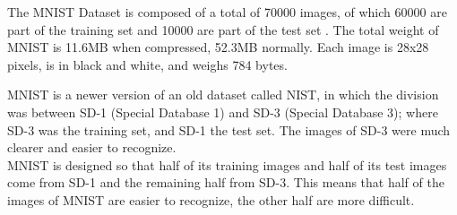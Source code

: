 The MNIST Dataset is composed of a total of 70000 images, of which 60000 are part of the training set and 10000 are part of the test set \cite{MNIST}.
The total weight of MNIST is 11.6MB when compressed, 52.3MB normally. Each image is 28x28 pixels, is in black and white, and weighs 784 bytes.

MNIST is a newer version of an old dataset called NIST, in which the division was between SD-1 (Special Database 1) and SD-3 (Special Database 3); where SD-3 was the training set, and SD-1 the test set. The images of SD-3 were much clearer and easier to recognize.
\\[0.3cm]MNIST is designed so that half of its training images and half of its test images come from SD-1 and the remaining half from SD-3.
This means that half of the images of MNIST are easier to recognize, the other half are more difficult.

